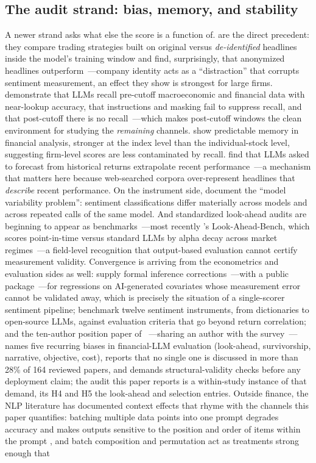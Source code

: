 \subsection{The audit strand: bias, memory, and stability}

A newer strand asks what else the score is a function of. \citet{glasserman2023} are the direct precedent: they compare trading strategies built on original versus \emph{de-identified} headlines inside the model's training window and find, surprisingly, that anonymized headlines outperform~---company identity acts as a ``distraction'' that corrupts sentiment measurement, an effect they show is strongest for large firms. \citet{lopezlira2025} demonstrate that LLMs recall pre-cutoff macroeconomic and financial data with near-lookup accuracy, that instructions and masking fail to suppress recall, and that post-cutoff there is no recall~---which makes post-cutoff windows the clean environment for studying the \emph{remaining} channels. \citet{didisheim2025} show predictable memory in financial analysis, stronger at the index level than the individual-stock level, suggesting firm-level scores are less contaminated by recall. \citet{chen2025} find that LLMs asked to forecast from historical returns extrapolate recent performance~---a mechanism that matters here because web-searched corpora over-represent headlines that \emph{describe} recent performance. On the instrument side, \citet{herrera2025} document the ``model variability problem'': sentiment classifications differ materially across models and across repeated calls of the same model. And standardized look-ahead audits are beginning to appear as benchmarks~---most recently \citet{benhenda2026}'s Look-Ahead-Bench, which scores point-in-time versus standard LLMs by alpha decay across market regimes~---a field-level recognition that output-based evaluation cannot certify measurement validity. Convergence is arriving from the econometrics and evaluation sides as well: \citet{christensen2026} supply formal inference corrections~---with a public package~---for regressions on AI-generated covariates whose measurement error cannot be validated away, which is precisely the situation of a single-scorer sentiment pipeline; \citet{bisharat2026} benchmark twelve sentiment instruments, from dictionaries to open-source LLMs, against evaluation criteria that go beyond return correlation; and the ten-author position paper of \citet{kong2026}~---sharing an author with the \citet{nie2024survey} survey~---names five recurring biases in financial-LLM evaluation (look-ahead, survivorship, narrative, objective, cost), reports that no single one is discussed in more than 28\% of 164 reviewed papers, and demands structural-validity checks before any deployment claim; the audit this paper reports is a within-study instance of that demand, its H4 and H5 the look-ahead and selection entries. Outside finance, the NLP literature has documented context effects that rhyme with the channels this paper quantifies: batching multiple data points into one prompt degrades accuracy and makes outputs sensitive to the position and order of items within the prompt \citep{lin2024batch, liu2024lost}, and batch composition and permutation act as treatments strong enough that 